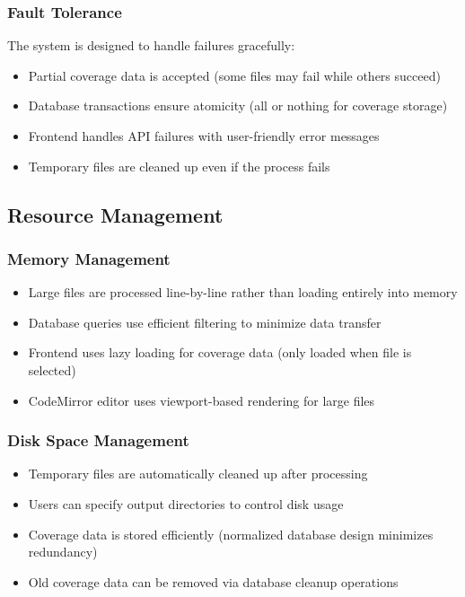 \subsubsection{Fault Tolerance}

The system is designed to handle failures gracefully:
\begin{itemize}
    \item Partial coverage data is accepted (some files may fail while others succeed)
    \item Database transactions ensure atomicity (all or nothing for coverage storage)
    \item Frontend handles API failures with user-friendly error messages
    \item Temporary files are cleaned up even if the process fails
\end{itemize}

\subsection{Resource Management}

\subsubsection{Memory Management}

\begin{itemize}
    \item Large files are processed line-by-line rather than loading entirely into memory
    \item Database queries use efficient filtering to minimize data transfer
    \item Frontend uses lazy loading for coverage data (only loaded when file is selected)
    \item CodeMirror editor uses viewport-based rendering for large files
\end{itemize}

\subsubsection{Disk Space Management}

\begin{itemize}
    \item Temporary files are automatically cleaned up after processing
    \item Users can specify output directories to control disk usage
    \item Coverage data is stored efficiently (normalized database design minimizes redundancy)
    \item Old coverage data can be removed via database cleanup operations
\end{itemize}

